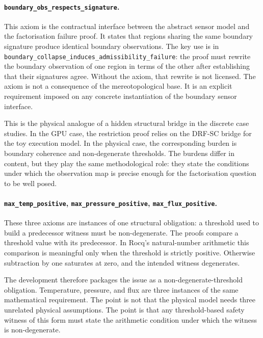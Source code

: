 \documentclass[a4paper,11pt]{article}
\begin{document}
\paragraph{\texttt{boundary\_obs\_respects\_signature}.}%
This axiom is the contractual interface between the abstract sensor model and
the factorisation failure proof. It states that regions sharing the same
boundary signature produce identical boundary observations. The key use is in
\texttt{boundary\_collapse\_induces\_\allowbreak{}admissibility\_failure}: the proof must
rewrite the boundary observation of one region in terms of the other after
establishing that their signatures agree. Without the axiom, that rewrite is
not licensed. The axiom is not a consequence of the mereotopological base. It
is an explicit requirement imposed on any concrete instantiation of the boundary
sensor interface.

This is the physical analogue of a hidden structural bridge in the discrete
case studies.  In the GPU case, the restriction proof relies on the DRF-SC
bridge for the toy execution model.  In the physical case, the corresponding
burden is boundary coherence and non-degenerate thresholds.  The burdens
differ in content, but they play the same methodological role: they state the
conditions under which the observation map is precise enough for the
factorisation question to be well posed.

\paragraph{\texttt{max\_temp\_positive}, \texttt{max\_pressure\_positive},
\texttt{max\_flux\_positive}.}
These three axioms are instances of one structural obligation: a threshold
used to build a predecessor witness must be non-degenerate.  The proofs
compare a threshold value with its predecessor.  In Rocq's natural-number
arithmetic this comparison is meaningful only when the threshold is strictly
positive.  Otherwise subtraction by one saturates at zero, and the intended
witness degenerates.

The development therefore packages the issue as a non-degenerate-threshold
obligation.  Temperature, pressure, and flux are three instances of the same
mathematical requirement.  The point is not that the physical model needs
three unrelated physical assumptions.  The point is that any threshold-based
safety witness of this form must state the arithmetic condition under which
the witness is non-degenerate.
\end{document}
